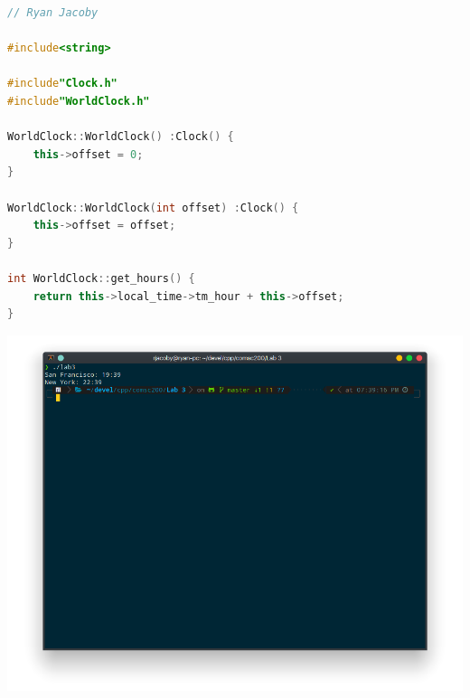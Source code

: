\documentclass[letterpaper, 11pt]{article}
\begin{document}
\begin{lstlisting}[language=C++, caption=WorldClockImp.cpp]
// Ryan Jacoby

#include<string>

#include"Clock.h"
#include"WorldClock.h"

WorldClock::WorldClock() :Clock() {
    this->offset = 0;
}

WorldClock::WorldClock(int offset) :Clock() {
    this->offset = offset;
}

int WorldClock::get_hours() {
    return this->local_time->tm_hour + this->offset;
}
\end{lstlisting}

\includegraphics[scale=0.5]{clock_run.png}
\end{document}
